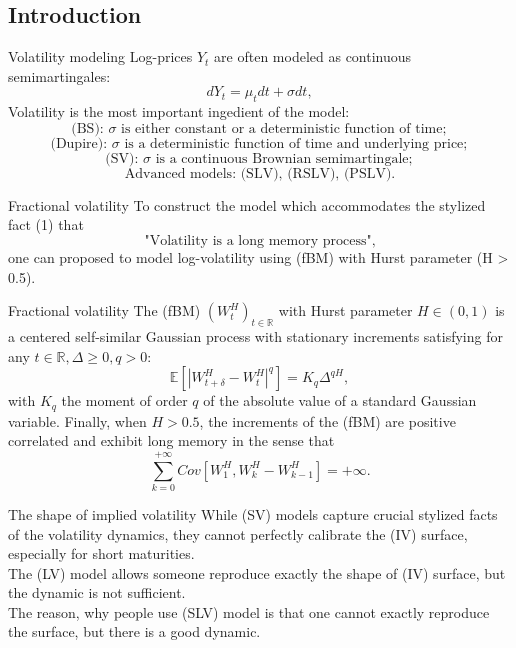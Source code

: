 \subsection{Introduction}
    \begin{frame}{Volatility modeling}
        Log-prices $Y_t$ are often modeled as continuous semimartingales:
            $$dY_t = \mu_tdt + \sigma dt,$$
        Volatility is the most important ingedient of the model: \\
        $$\text{(BS): }\sigma \text{ is either constant or a deterministic function of time};$$
        $$\text{(Dupire): }\sigma \text{ is a deterministic function of time and underlying price};$$
        $$\text{(SV): }\sigma \text{ is a continuous Brownian semimartingale};$$
        $$\text{Advanced models: (SLV), (RSLV), (PSLV).}$$
    \end{frame}

    \begin{frame}{Fractional volatility}
        To construct the model which accommodates the stylized fact (1) that $$\text{"Volatility is a long memory process",}$$ one can proposed to model log-volatility using (fBM) with Hurst parameter (H > 0.5).
    \end{frame}

    \begin{frame}{Fractional volatility}
        The (fBM) $(W_t^H)_{t\in \mathbb{R}}$ with Hurst parameter $H \in (0, 1)$ is a centered self-similar Gaussian process with stationary increments satisfying for any $t \in \mathbb{R}, \Delta \geq 0, q > 0:$ $$\mathbb{E}[|W_{t + \delta}^H - W_t^H|^q] = K_q \Delta^{qH},$$ with $K_q$ the moment of order $q$ of the absolute value of a standard Gaussian variable. Finally, when $H > 0.5$, the increments of the (fBM) are positive correlated and exhibit long memory in the sense that $$\sum_{k = 0}^{+\infty} Cov[W_1^H, W_k^H - W_{k - 1}^H] = +\infty.$$
    \end{frame}

    \begin{frame}{The shape of implied volatility}
                While (SV) models capture crucial stylized facts of the volatility dynamics, they cannot perfectly calibrate the (IV) surface, especially for short maturities.\\
                The (LV) model allows someone reproduce exactly the shape of (IV) surface, but the dynamic is not sufficient.\\
                The reason, why people use (SLV) model is that one cannot exactly reproduce the surface, but there is a good dynamic.\\
    \end{frame}
    

